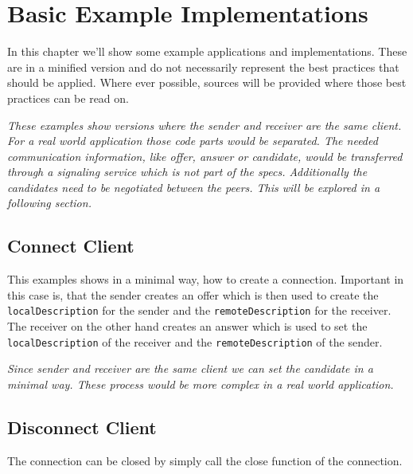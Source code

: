 \section{Basic Example Implementations}
In this chapter we'll show some example applications and implementations. These are in a minified version and do not necessarily represent the best practices that should be applied. Where ever possible, sources will be provided where those best practices can be read on.

\textit{These examples show versions where the sender and receiver are the same client. For a real world application those code parts would be separated. The needed communication information, like offer, answer or  candidate, would be transferred through a signaling service which is not part of the  specs. Additionally the  candidates need to be negotiated between the peers. This will be explored in a following section.}

\subsection{Connect Client}
This examples shows in a minimal way, how to create a  connection. Important in this case is, that the sender creates an offer which is then used to create the \lstinline[basicstyle=\ttfamily\color{black}]|localDescription| for the sender and the \lstinline[basicstyle=\ttfamily\color{black}]|remoteDescription| for the receiver. The receiver on the other hand creates an answer which is used to set the \lstinline[basicstyle=\ttfamily\color{black}]|localDescription| of the receiver and the \lstinline[basicstyle=\ttfamily\color{black}]|remoteDescription| of the sender.

\textit{Since sender and receiver are the same client we can set the  candidate in a minimal way. These process would be more complex in a real world application.}


\subsection{Disconnect Client}
The connection can be closed by simply call the close function of the  connection.


